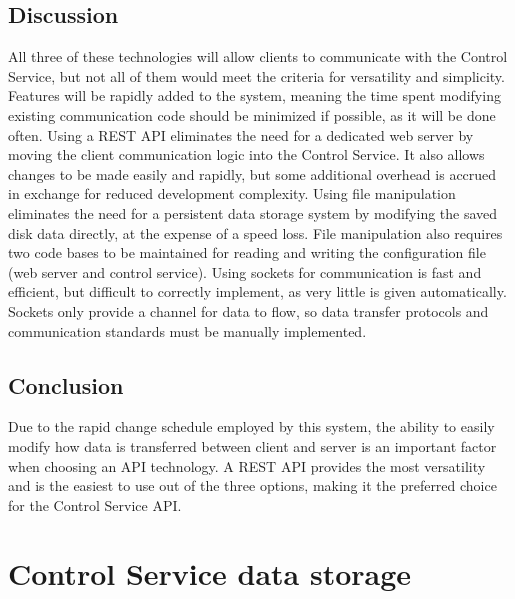 \documentclass[onecolumn, draftclsnofoot,10pt, compsoc]{IEEEtran}
\begin{document}
		\subsection{Discussion}
		All three of these technologies will allow clients to communicate with the Control Service, but not all of them would meet the criteria for versatility and simplicity.
		Features will be rapidly added to the system, meaning the time spent modifying existing communication code should be minimized if possible, as it will be done often.
		Using a REST API eliminates the need for a dedicated web server by moving the client communication logic into the Control Service. It also allows changes to be made easily and rapidly, but some additional overhead is accrued in exchange for reduced development complexity.
		Using file manipulation eliminates the need for a persistent data storage system by modifying the saved disk data directly, at the expense of a speed loss.
		File manipulation also requires two code bases to be maintained for reading and writing the configuration file (web server and control service).
		Using sockets for communication is fast and efficient, but difficult to correctly implement, as very little is given automatically.
		Sockets only provide a channel for data to flow, so data transfer protocols and communication standards must be manually implemented.

		\subsection{Conclusion}
		Due to the rapid change schedule employed by this system, the ability to easily modify how data is transferred between client and server is an important factor when choosing an API technology.
		A REST API provides the most versatility and is the easiest to use out of the three options, making it the preferred choice for the Control Service API.


	\section{Control Service data storage}
\end{document}
